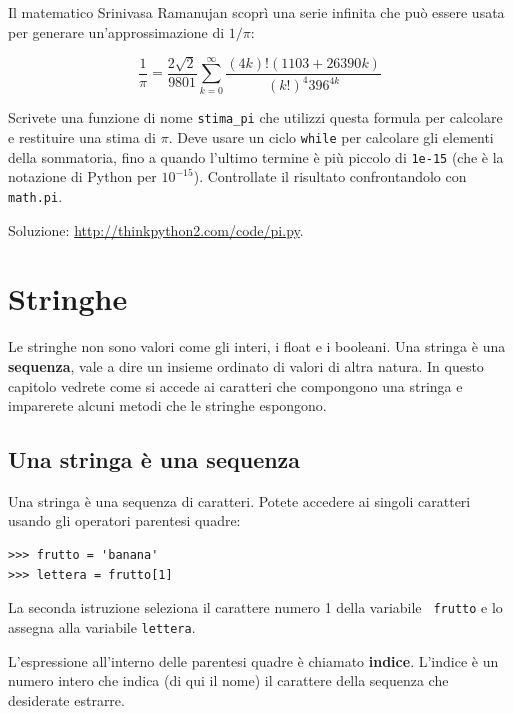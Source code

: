 \documentclass[10pt]{book}
\begin{document}
\vspace{0.2in}
\begin{exercise}

Il matematico Srinivasa Ramanujan scoprì una serie infinita che può essere usata per generare un'approssimazione di $1 / \pi$:

\[ \frac{1}{\pi} = \frac{2\sqrt{2}}{9801} 
\sum^\infty_{k=0} \frac{(4k)!(1103+26390k)}{(k!)^4 396^{4k}} \]

Scrivete una funzione di nome \verb"stima_pi" che utilizzi questa formula per calcolare e restituire una stima di $\pi$.  Deve usare un ciclo {\tt while}
per calcolare gli elementi della sommatoria, fino a quando l'ultimo termine è più piccolo di {\tt 1e-15} (che è la notazione di Python per $10^{-15}$).
Controllate il risultato confrontandolo con {\tt math.pi}.

Soluzione: \url{http://thinkpython2.com/code/pi.py}.

\end{exercise}


\chapter{Stringhe}
\label{strings}

Le stringhe non sono valori come gli interi, i float e i booleani. Una stringa è una {\bf sequenza}, vale a dire un insieme ordinato di valori di altra natura.  In questo capitolo vedrete come si accede ai caratteri che compongono una stringa e imparerete alcuni metodi che le stringhe espongono.


\section{Una stringa è una sequenza}

Una stringa è una sequenza di caratteri. Potete accedere ai singoli caratteri usando gli operatori parentesi quadre:

\begin{verbatim}
>>> frutto = 'banana'
>>> lettera = frutto[1]
\end{verbatim}
%
La seconda istruzione seleziona il carattere numero 1 della variabile {\tt
frutto} e lo assegna alla variabile {\tt lettera}.  

L'espressione all'interno delle parentesi quadre è chiamato {\bf indice}.  
L'indice è un numero intero che indica (di qui il nome) il carattere della sequenza che desiderate estrarre.
\end{document}

